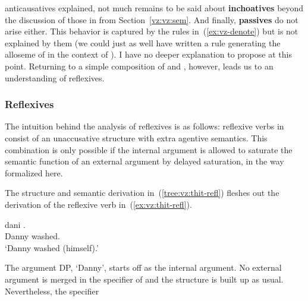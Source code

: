 \begin{exe}
\begin{xlist}
\begin{xlist}
\begin{exe}
\begin{xlist}
\begin{xlist}
\begin{exe}
\begin{xlist}
\begin{xlist}
\begin{exe}
\begin{exe}
\begin{xlist}
\begin{exe}
\begin{exe}
\begin{xlist}
\begin{exe}
\begin{exe}
\begin{exe}
\begin{exe}
\begin{exe}
\begin{xlist}
\begin{exe}
\begin{xlist}
\begin{exe}
\begin{exe}
\begin{xlist}
\begin{exe}
\begin{xlist}
\begin{exe}
\begin{xlist}
\begin{exe}
\begin{exe}
\begin{exe}
\begin{xlist}
\begin{exe}
\begin{exe}
\begin{exe}
\begin{xlist}
\begin{exe}
\begin{xlist}
\begin{exe}
\begin{xlist}
\begin{exe}
\begin{xlist}
\begin{exe}
\begin{exe}
\begin{exe}
\begin{exe}
\begin{xlist}
\begin{exe}
\begin{xlist}
\begin{exe}
\begin{xlist}
\begin{exe}
\begin{xlist}
\begin{exe}
\begin{xlist}
\begin{exe}
\begin{xlist}
\begin{exe}
\begin{exe}
\begin{exe}
\begin{exe}
\begin{xlist}
\begin{exe}
\begin{xlist}
\begin{exe}
\begin{xlist}
\begin{exe}
\begin{exe}
\begin{xlist}
\begin{exe}
\begin{xlist}
\begin{exe}
\begin{exe}
\begin{exe}
\begin{exe}
\begin{xlist}
\begin{xlist}
\begin{exe}
\begin{xlist}
\begin{exe}
\begin{exe}
\begin{exe}
\begin{xlist}
\begin{exe}
\begin{exe}
\begin{xlist}
\begin{exe}
\begin{exe}
\begin{exe}
\begin{xlist}
\begin{xlist}
\begin{exe}
\begin{xlist}
\begin{exe}
\begin{exe}
\begin{exe}
\begin{exe}
\begin{xlist}
\begin{exe}
\begin{xlist}
\begin{exe}
\begin{xlist}
\begin{exe}
\begin{xlist}
\begin{exe}
\begin{exe}
anticausatives explained, not much remains to be said about \textbf{inchoatives} beyond the discussion of those in {\tnif} from Section~\ref{vz:vz:sem}. And finally, \textbf{passives} do not arise either. This behavior is captured by the rules in~(\ref{ex:vz-denote}) but is not explained by them (we could just as well have written a rule generating the  alloseme of {\vz} in the context of {\va}). I have no deeper explanation to propose at this point. Returning to a simple composition of {\vz} and {\va}, however, leads us to an understanding of reflexives.

		\subsubsection{Reflexives} \label{vz:va:vzva:refl}
The intuition behind the analysis of reflexives is as follows: reflexive verbs in {\thit} consist of an unaccusative structure with extra agentive semantics. This combination is only possible if the internal argument is allowed to saturate the semantic function of an external argument by delayed saturation, in the way formalized here.

The structure and semantic derivation in~(\ref{tree:vz:thit-refl}) fleshes out the derivation of the reflexive verb in~(\ref{ex:vz:thit-refl}).
 \begin{exe}
\ex  \label{ex:vz:thit-refl} 
{ \gll dani .\\
   Danny washed.\\
 \glt `Danny washed (himself).' } 

 \z 

The argument DP, `Danny', starts off as the internal argument. No external argument is merged in the specifier of {\vz} and the structure is built up as usual. Nevertheless, the specifier 
\end{exe}
\end{exe}
\end{exe}
\end{xlist}
\end{exe}
\end{xlist}
\end{exe}
\end{xlist}
\end{exe}
\end{xlist}
\end{exe}
\end{exe}
\end{exe}
\end{exe}
\end{xlist}
\end{exe}
\end{xlist}
\end{xlist}
\end{exe}
\end{exe}
\end{exe}
\end{xlist}
\end{exe}
\end{exe}
\end{xlist}
\end{exe}
\end{exe}
\end{exe}
\end{xlist}
\end{exe}
\end{xlist}
\end{xlist}
\end{exe}
\end{exe}
\end{exe}
\end{exe}
\end{xlist}
\end{exe}
\end{xlist}
\end{exe}
\end{exe}
\end{xlist}
\end{exe}
\end{xlist}
\end{exe}
\end{xlist}
\end{exe}
\end{exe}
\end{exe}
\end{exe}
\end{xlist}
\end{exe}
\end{xlist}
\end{exe}
\end{xlist}
\end{exe}
\end{xlist}
\end{exe}
\end{xlist}
\end{exe}
\end{xlist}
\end{exe}
\end{exe}
\end{exe}
\end{exe}
\end{xlist}
\end{exe}
\end{xlist}
\end{exe}
\end{xlist}
\end{exe}
\end{xlist}
\end{exe}
\end{exe}
\end{exe}
\end{xlist}
\end{exe}
\end{exe}
\end{exe}
\end{xlist}
\end{exe}
\end{xlist}
\end{exe}
\end{xlist}
\end{exe}
\end{exe}
\end{xlist}
\end{exe}
\end{xlist}
\end{exe}
\end{exe}
\end{exe}
\end{exe}
\end{exe}
\end{xlist}
\end{exe}
\end{exe}
\end{xlist}
\end{exe}
\end{exe}
\end{xlist}
\end{xlist}
\end{exe}
\end{xlist}
\end{xlist}
\end{exe}
\end{xlist}
\end{xlist}
\end{exe}

